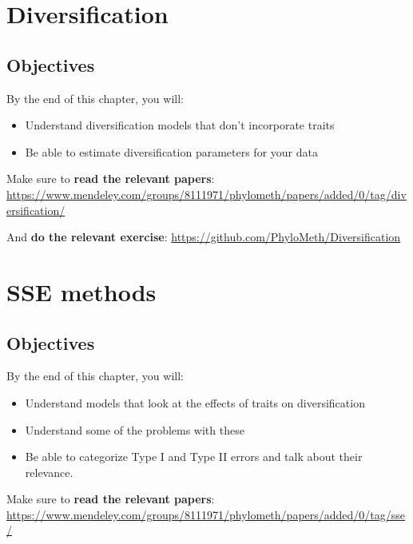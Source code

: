 \documentclass[]{article}
\providecommand{\tightlist}{%
  \setlength{\itemsep}{0pt}\setlength{\parskip}{0pt}}
\theoremstyle{definition}
\theoremstyle{definition}
\theoremstyle{definition}
\theoremstyle{remark}
\begin{document}
\hypertarget{diversification}{%
\section{Diversification}\label{diversification}}

\hypertarget{objectives-4}{%
\subsection{Objectives}\label{objectives-4}}

By the end of this chapter, you will:

\begin{itemize}
\tightlist
\item
  Understand diversification models that don't incorporate traits
\item
  Be able to estimate diversification parameters for your data
\end{itemize}

Make sure to \textbf{read the relevant papers}:
\url{https://www.mendeley.com/groups/8111971/phylometh/papers/added/0/tag/diversification/}

And \textbf{do the relevant exercise}:
\url{https://github.com/PhyloMeth/Diversification}

\hypertarget{sse-methods}{%
\section{SSE methods}\label{sse-methods}}

\hypertarget{objectives-5}{%
\subsection{Objectives}\label{objectives-5}}

By the end of this chapter, you will:

\begin{itemize}
\tightlist
\item
  Understand models that look at the effects of traits on
  diversification
\item
  Understand some of the problems with these
\item
  Be able to categorize Type I and Type II errors and talk about their
  relevance.
\end{itemize}

Make sure to \textbf{read the relevant papers}:
\url{https://www.mendeley.com/groups/8111971/phylometh/papers/added/0/tag/sse/}
\end{document}

